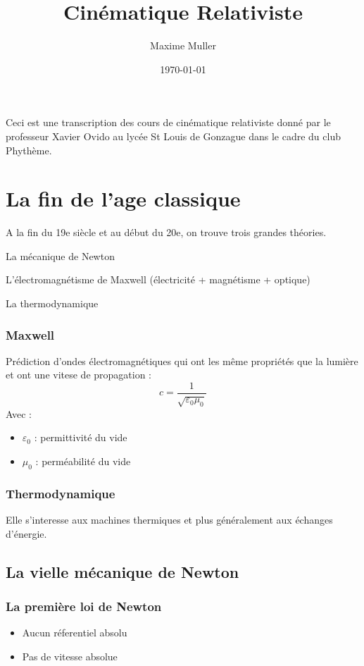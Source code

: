 \documentclass{article}
\title{Cinématique Relativiste}
\author{Maxime Muller}
\date{\today}
\begin{document}
\maketitle

Ceci est une transcription des cours de cinématique relativiste donné par le professeur Xavier Ovido au lycée St Louis de Gonzague dans le cadre du club Phythème.

\section{La fin de l'age classique}
A la fin du 19e siècle et au début du 20e, on trouve trois grandes théories.
    \item La mécanique de Newton
    \item L'électromagnétisme de Maxwell (électricité + magnétisme + optique)
    \item La thermodynamique
\subsubsection{Maxwell}
Prédiction d'ondes électromagnétiques qui ont les même propriétés que la lumière et ont une vitese de propagation :
\begin{equation*}
    c = \frac{1}{\sqrt{\varepsilon_0 \mu_0}}
\end{equation*}
Avec :
\begin{itemize}
    \item $\varepsilon_0$ : permittivité du vide
    \item $\mu_0$ : perméabilité du vide
\end{itemize}
\subsubsection{Thermodynamique}
Elle s'interesse aux machines thermiques et plus généralement aux échanges d'énergie.
\newpage
\subsection{La vielle mécanique de Newton}
\subsubsection{La première loi de Newton}
\begin{itemize}
    \item Aucun réferentiel absolu
    \item Pas de vitesse absolue
\end{itemize}
\end{document}
